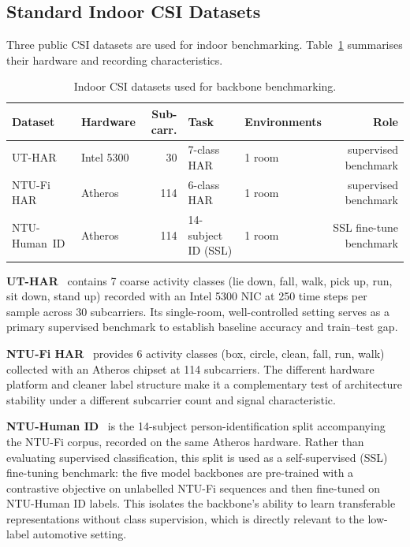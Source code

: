 \documentclass[english,bibtex]{kththesis}
\begin{document}
\subsection{Standard Indoor CSI Datasets}
\label{sec:indoordatasets}

Three public CSI datasets are used for indoor benchmarking. Table~\ref{tab:datasets} summarises their hardware and recording characteristics.

\begin{table}[!ht]
\caption{Indoor CSI datasets used for backbone benchmarking.}
\label{tab:datasets}
\centering
\small
\begin{tabular}{llrllr}
\toprule
\textbf{Dataset} & \textbf{Hardware} & \textbf{Sub-carr.} & \textbf{Task} & \textbf{Environments} & \textbf{Role} \\
\midrule
UT-HAR          & Intel 5300 & 30  & 7-class HAR         & 1 room  & supervised benchmark \\
NTU-Fi HAR      & Atheros    & 114 & 6-class HAR         & 1 room  & supervised benchmark \\
NTU-Human~ID    & Atheros    & 114 & 14-subject ID (SSL) & 1 room  & SSL fine-tune benchmark \\
\bottomrule
\end{tabular}
\end{table}

\textbf{UT-HAR}~\cite{yousefi2017survey} contains 7 coarse activity classes (lie down, fall, walk, pick up, run, sit down, stand up) recorded with an Intel 5300 NIC at 250 time steps per sample across 30 subcarriers. Its single-room, well-controlled setting serves as a primary supervised benchmark to establish baseline accuracy and train--test gap.

\textbf{NTU-Fi HAR}~\cite{yang2022efficientfi} provides 6 activity classes (box, circle, clean, fall, run, walk) collected with an Atheros chipset at 114 subcarriers. The different hardware platform and cleaner label structure make it a complementary test of architecture stability under a different subcarrier count and signal characteristic.

\textbf{NTU-Human ID}~\cite{wang2022caution} is the 14-subject person-identification split accompanying the NTU-Fi corpus, recorded on the same Atheros hardware. Rather than evaluating supervised classification, this split is used as a self-supervised (SSL) fine-tuning benchmark: the five model backbones are pre-trained with a contrastive objective on unlabelled NTU-Fi sequences and then fine-tuned on NTU-Human ID labels. This isolates the backbone's ability to learn transferable representations without class supervision, which is directly relevant to the low-label automotive setting.
\end{document}
